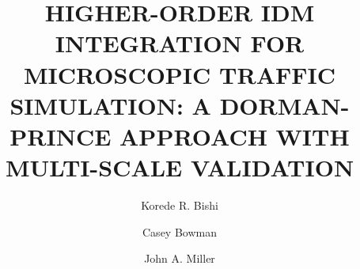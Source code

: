 \documentclass{scspaperproc}
\theoremstyle{scsthe}
\begin{document}
%
%

    \def\SCSconferencename{Annual Modeling and Simulation Conference}

    \def\SCSconferenceacro{ANNSIM'26}

    \def\SCSpublicationyear{2026}

    \def\SCSconferenceeditors{G. Rabadi, V. Prabhu, R. Cárdenas, A. Bany Abdelnabi, J. Jabbour, and M. Germanos}

    \def\SCSconferencedates{May 4-7}

    \def\SCSconferencevenue{University of Central Florida, Orlando, Florida, USA}

    \title{HIGHER-ORDER IDM INTEGRATION FOR MICROSCOPIC TRAFFIC SIMULATION: A DORMAN-PRINCE APPROACH WITH MULTI-SCALE VALIDATION}

    \author[\authorrefmark{1}]{Korede R. Bishi}
    \author[\authorrefmark{2}]{Casey Bowman}
    \author[\authorrefmark{1}]{John A. Miller}



\end{document}
